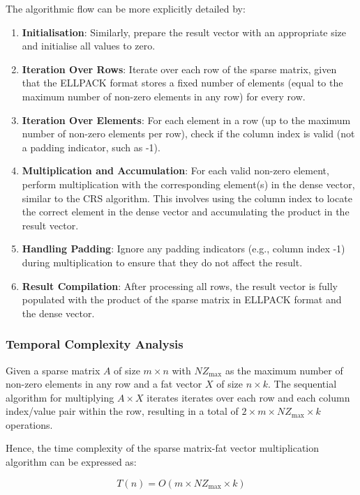 \documentclass[12pt,oneside]{book} %
\begin{document}
The algorithmic flow can be more explicitly detailed by:
\begin{enumerate}
    \item \textbf{Initialisation}: Similarly, prepare the result vector with an appropriate size and initialise all values to zero.
    \item \textbf{Iteration Over Rows}: Iterate over each row of the sparse matrix, given that the ELLPACK format stores a fixed number of elements (equal to the maximum number of non-zero elements in any row) for every row.
    \item \textbf{Iteration Over Elements}: For each element in a row (up to the maximum number of non-zero elements per row), check if the column index is valid (not a padding indicator, such as -1).
    \item \textbf{Multiplication and Accumulation}: For each valid non-zero element, perform multiplication with the corresponding element(s) in the dense vector, similar to the CRS algorithm. This involves using the column index to locate the correct element in the dense vector and accumulating the product in the result vector.
    \item \textbf{Handling Padding}: Ignore any padding indicators (e.g., column index -1) during multiplication to ensure that they do not affect the result.
    \item \textbf{Result Compilation}: After processing all rows, the result vector is fully populated with the product of the sparse matrix in ELLPACK format and the dense vector.
\end{enumerate}

\subsubsection{Temporal Complexity Analysis}

Given a sparse matrix \(A\) of size \(m \times n\) with \(NZ_{\text{max}}\) as
the maximum number of non-zero elements in any row and a fat vector $X$ of size
$n \times k$. The sequential algorithm for multiplying \(A \times X\) iterates
iterates over each row and each column index/value pair within the row,
resulting in a total of \(2 \times m \times NZ_{\text{max}} \times k\)
operations.

Hence, the time complexity of the sparse matrix-fat vector multiplication
algorithm can be expressed as:

\begin{equation}
    T(n) = O(m \times NZ_{\text{max}} \times k)
\end{equation}
\end{document}
